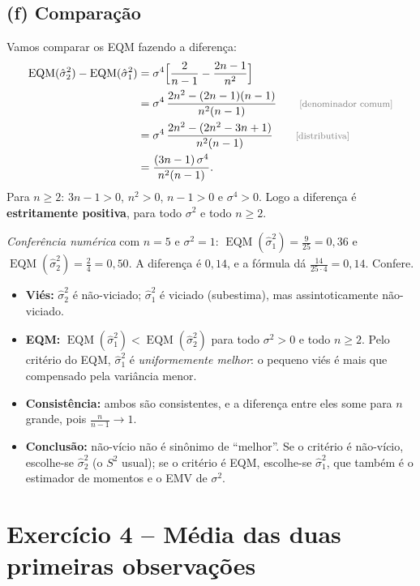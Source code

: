\documentclass[11pt,a4paper]{article}
\newcommand{\EQM}{\operatorname{EQM}}
\newcommand{\just}[1]{\tag*{\footnotesize\textcolor{gray}{[#1]}}}
\begin{document}
\subsection*{(f) Comparação}
Vamos comparar os EQM fazendo a diferença:
\begin{align*}
\EQM(\hat\sigma^2_2)-\EQM(\hat\sigma^2_1)
&=\sigma^4\Big[\frac{2}{n-1}-\frac{2n-1}{n^2}\Big]\\
&=\sigma^4\,\frac{2n^2-(2n-1)(n-1)}{n^2(n-1)} \just{denominador comum}\\
&=\sigma^4\,\frac{2n^2-(2n^2-3n+1)}{n^2(n-1)} \just{distributiva}\\
&=\frac{(3n-1)\,\sigma^4}{n^2(n-1)} .
\end{align*}
Para $n\ge2$: $3n-1>0$, $n^2>0$, $n-1>0$ e $\sigma^4>0$. Logo a diferença é \textbf{estritamente positiva}, para todo $\sigma^2$ e todo $n\ge2$.

\textit{Conferência numérica} com $n=5$ e $\sigma^2=1$: $\EQM(\hat\sigma^2_1)=\frac{9}{25}=0{,}36$ e $\EQM(\hat\sigma^2_2)=\frac{2}{4}=0{,}50$. A diferença é $0{,}14$, e a fórmula dá $\frac{14}{25\cdot4}=0{,}14$. Confere.

\begin{resposta}
\begin{itemize}[leftmargin=1.2em]
\item \textbf{Viés:} $\hat\sigma^2_2$ é não-viciado; $\hat\sigma^2_1$ é viciado (subestima), mas assintoticamente não-viciado.
\item \textbf{EQM:} $\EQM(\hat\sigma^2_1)<\EQM(\hat\sigma^2_2)$ para todo $\sigma^2>0$ e todo $n\ge2$. Pelo critério do EQM, $\hat\sigma^2_1$ é \emph{uniformemente melhor}: o pequeno viés é mais que compensado pela variância menor.
\item \textbf{Consistência:} ambos são consistentes, e a diferença entre eles some para $n$ grande, pois $\frac{n}{n-1}\to1$.
\item \textbf{Conclusão:} não-vício não é sinônimo de ``melhor''. Se o critério é não-vício, escolhe-se $\hat\sigma^2_2$ (o $S^2$ usual); se o critério é EQM, escolhe-se $\hat\sigma^2_1$, que também é o estimador de momentos e o EMV de $\sigma^2$.
\end{itemize}
\end{resposta}

\section{Exercício 4 -- Média das duas primeiras observações}
\end{document}
